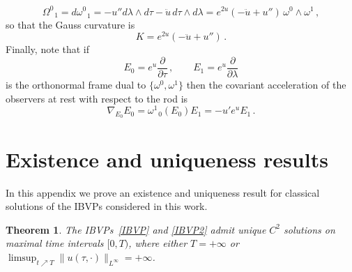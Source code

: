 \documentclass[10pt]{amsart}
\newtheorem{Thm}{Theorem}[section]
\begin{document}
\begin{equation}
\Omega^0_{\,\,\,\,1} = d\omega^0_{\,\,\,\,1} = - u'' d\lambda \wedge d\tau - \ddot{u} \, d\tau \wedge d\lambda = e^{2u} (-\ddot{u} + u'') \, \omega^0 \wedge \omega^1\, ,
\end{equation}
so that the Gauss curvature is
\begin{equation} \label{Gausscurvature}
K = e^{2u} (-\ddot{u} + u'') \, .
\end{equation}
Finally, note that if
\begin{equation}
E_0 = e^{u} \frac{\partial}{\partial \tau} \, , \qquad E_1 = e^{u} \frac{\partial}{\partial \lambda}
\end{equation}
is the orthonormal frame dual to $\{\omega^0,\omega^1\}$ then the covariant acceleration of the observers at rest with respect to the rod is
\begin{equation}
\nabla_{E_0} E_0 =  \omega^1_{\,\,\,\,0}(E_0) E_1 = - u' e^{u} E_1 \, .
\end{equation}
%
\section{Existence and uniqueness results}\label{appendixB}
%
In this appendix we prove an existence and uniqueness result for classical solutions of the IBVPs considered in this work.

\begin{Thm} \label{GWPBA}
The IBVPs~\eqref{IBVP} and \eqref{IBVP2} admit unique $C^2$ solutions on maximal time intervals $[0,T)$, where either $T = + \infty$ or $\limsup_{t {\scriptscriptstyle \nearrow} T} \| u(\tau, \cdot)\|_{L^\infty} = + \infty$.
\end{Thm}
\end{document}
